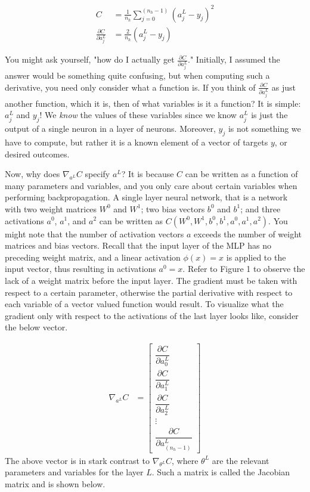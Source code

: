 \documentclass{article}
\begin{document}
\begin{align}
	C                                     & = \frac{1}{n_h} \sum_{j=0}^{(n_h - 1)} { (a_{j}^{L} - y_j)^{2} } \\
	\frac{\partial C}{\partial a_{j}^{L}} & = \frac{2}{n_h} (a_{j}^{L} - y_j)
\end{align}

You might ask yourself, "how do I actually get
$\frac{\partial C}{\partial a_{j}^{L}}$." Initially, I assumed the answer would
be something quite confusing, but when computing such a derivative, you need
only consider what a function is. If you think of $\frac{\partial C}{\partial a_{j}^{L}}$
as just another function, which it is, then of what variables is it a function?
It is simple: $a_{j}^{L}$ and $y_j$! We \textit{know} the values of these variables
since we know $a_{j}^{L}$ is just the output of a single neuron in a layer
of neurons. Moreover, $y_j$ is not something we have to compute, but rather it
is a known element of a vector of targets $y$, or desired outcomes.

Now, why does $\nabla_{a^{L}} C$ specify $a^{L}$? It is because $C$ can be written as
a function of many parameters and variables, and you only care about certain variables
when performing backpropagation. A single layer neural network,
that is a network with two weight matrices $W^{0}$ and $W^{1}$; two bias vectors
$b^{0}$ and $b^{1}$; and three activations $a^{0}$, $a^{1}$, and $a^{2}$
can be written as $C(W^{0}, W^{1}, b^{0}, b^{1}, a^{0}, a^{1}, a^{2})$. You might
note that the number of activation vectors $a$ exceeds the number of weight matrices
and bias vectors. Recall that the input layer of the MLP has no preceding
weight matrix, and a linear activation $\phi(x) = x$ is applied to the input vector,
thus resulting in activations $a^{0} = x$. Refer to Figure 1 to observe the lack
of a weight matrix before the input layer. The gradient must be taken with respect to a
certain parameter, otherwise the partial derivative with respect
to each variable of a vector valued function would result. To visualize what the gradient
only with respect to the activations of the last layer looks like, consider the below vector.

\begin{align}
	\nabla_{a^{L}} C & =
	\begin{bmatrix}
		\dfrac{\partial C}{\partial a_{0}^{L}} \\
		\dfrac{\partial C}{\partial a_{1}^{L}} \\
		\dfrac{\partial C}{\partial a_{2}^{L}} \\
		\vdots                                 \\
		\dfrac{\partial C}{\partial a_{(n_{h} - 1)}^{L}}
	\end{bmatrix}
\end{align}
The above vector is in stark contrast to $\nabla_{\theta^{L}} C$, where
$\theta^{L}$ are the relevant parameters and variables for the layer $L$.
Such a matrix is called the Jacobian matrix and is shown below.
\end{document}
